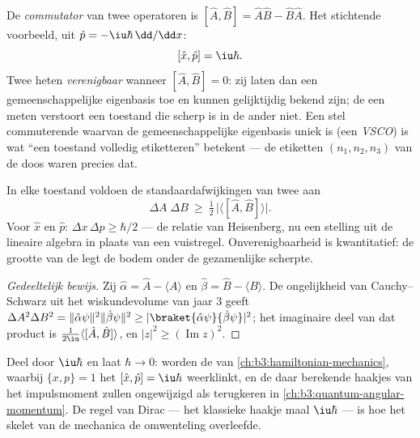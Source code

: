 \begin{definition}\label{def:b3:quantum-formalism:commutator}
De \emph{commutator} van twee operatoren is $[\hat A, \hat B] = \hat
A\hat B - \hat B\hat A$. Het stichtende voorbeeld, uit $\hat p =
-\iu\hbar\,\dd/\dd x$:
\[
[\hat x, \hat p] = \iu\hbar .
\]
Twee  heten \emph{verenigbaar} wanneer $[\hat A, \hat B] = 0$:
zij laten dan een gemeenschappelijke eigenbasis toe en kunnen gelijktijdig
bekend zijn; de een meten verstoort een toestand die scherp is in de ander
niet. Een stel commuterende  waarvan de gemeenschappelijke
eigenbasis uniek is (een \emph{VSCO}) is wat ``een toestand volledig
etiketteren'' betekent --- de etiketten $(n_1, n_2, n_3)$ van de doos waren
precies dat.
\end{definition}

\begin{theorem}\label{thm:b3:quantum-formalism:uncertainty}
In elke toestand voldoen de standaardafwijkingen van twee  aan
\[
\Delta A\;\Delta B \ \ge\ \tfrac12\,\big|\langle[\hat A, \hat
B]\rangle\big| .
\]
Voor $\hat x$ en $\hat p$: $\Delta x\,\Delta p \ge \hbar/2$ --- de relatie
van Heisenberg, nu een stelling uit de lineaire algebra in plaats van een
vuistregel. Onverenigbaarheid is kwantitatief: de grootte van de
 legt de bodem onder de gezamenlijke scherpte.
\end{theorem}

\begin{proof}[Gedeeltelijk bewijs]
Zij $\hat\alpha = \hat A - \langle A\rangle$ en $\hat\beta = \hat B -
\langle B\rangle$. De ongelijkheid van Cauchy--Schwarz uit het
wiskundevolume van jaar 3 geeft $\Delta A^2\Delta B^2 =
\|\hat\alpha\psi\|^2\|\hat\beta\psi\|^2 \ge
|\braket{\hat\alpha\psi}{\hat\beta\psi}|^2$; het imaginaire deel van dat
product is $\tfrac1{2\iu}\langle[\hat A, \hat B]\rangle$, en
$|z|^2 \ge (\operatorname{Im}z)^2$.
\end{proof}

\begin{remark}\label{rem:b3:quantum-formalism:poisson}
Deel door $\iu\hbar$ en laat $\hbar \to 0$:  worden de
 van \cref{ch:b3:hamiltonian-mechanics}, waarbij $\{x, p\} =
1$ het $[\hat x, \hat p] = \iu\hbar$ weerklinkt, en de daar berekende
haakjes van het impulsmoment zullen ongewijzigd als 
terugkeren in \cref{ch:b3:quantum-angular-momentum}. De regel van Dirac ---
het klassieke haakje maal $\iu\hbar$ --- is hoe het skelet van de mechanica
de omwenteling overleefde.
\end{remark}

